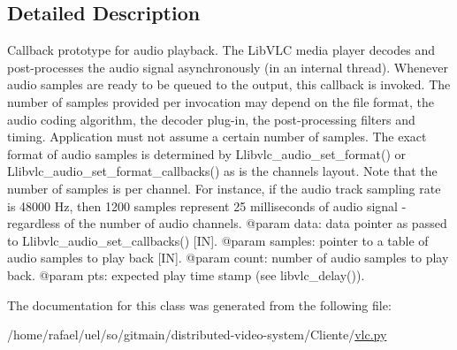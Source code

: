 \subsection{Detailed Description}
\begin{DoxyVerb}Callback prototype for audio playback.
The LibVLC media player decodes and post-processes the audio signal
asynchronously (in an internal thread). Whenever audio samples are ready
to be queued to the output, this callback is invoked.
The number of samples provided per invocation may depend on the file format,
the audio coding algorithm, the decoder plug-in, the post-processing
filters and timing. Application must not assume a certain number of samples.
The exact format of audio samples is determined by L{libvlc_audio_set_format}()
or L{libvlc_audio_set_format_callbacks}() as is the channels layout.
Note that the number of samples is per channel. For instance, if the audio
track sampling rate is 48000 Hz, then 1200 samples represent 25 milliseconds
of audio signal - regardless of the number of audio channels.
@param data: data pointer as passed to L{libvlc_audio_set_callbacks}() [IN].
@param samples: pointer to a table of audio samples to play back [IN].
@param count: number of audio samples to play back.
@param pts: expected play time stamp (see libvlc_delay()).
\end{DoxyVerb}
 

The documentation for this class was generated from the following file\+:\begin{DoxyCompactItemize}
\item 
/home/rafael/uel/so/gitmain/distributed-\/video-\/system/\+Cliente/\hyperlink{vlc_8py}{vlc.\+py}\end{DoxyCompactItemize}
